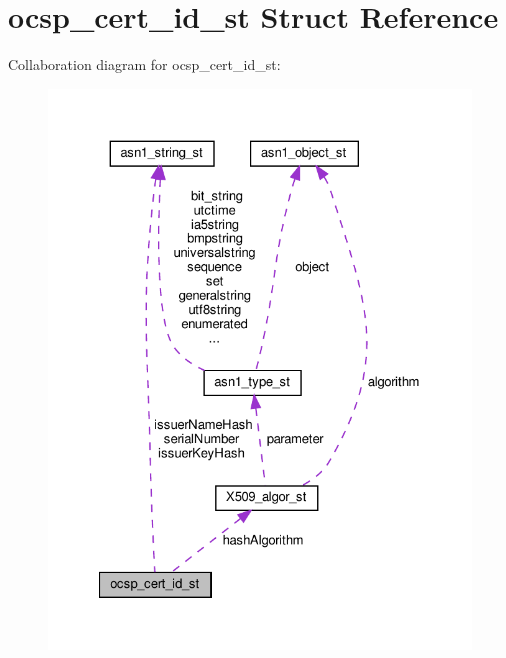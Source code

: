 \hypertarget{structocsp__cert__id__st}{}\section{ocsp\+\_\+cert\+\_\+id\+\_\+st Struct Reference}
\label{structocsp__cert__id__st}


Collaboration diagram for ocsp\+\_\+cert\+\_\+id\+\_\+st\+:
\nopagebreak
\begin{figure}[H]
\begin{center}
\leavevmode
\includegraphics[width=327pt]{structocsp__cert__id__st__coll__graph}
\end{center}
\end{figure}

